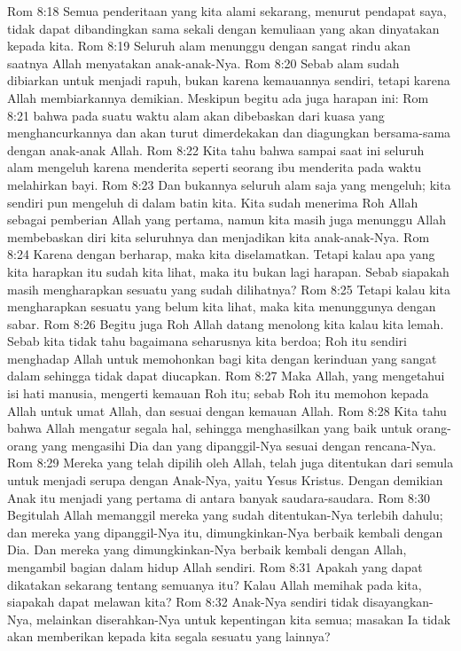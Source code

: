 Rom 8:18  Semua penderitaan yang kita alami sekarang, menurut pendapat saya, tidak dapat dibandingkan sama sekali dengan kemuliaan yang akan dinyatakan kepada kita.
Rom 8:19  Seluruh alam menunggu dengan sangat rindu akan saatnya Allah menyatakan anak-anak-Nya.
Rom 8:20  Sebab alam sudah dibiarkan untuk menjadi rapuh, bukan karena kemauannya sendiri, tetapi karena Allah membiarkannya demikian. Meskipun begitu ada juga harapan ini:
Rom 8:21  bahwa pada suatu waktu alam akan dibebaskan dari kuasa yang menghancurkannya dan akan turut dimerdekakan dan diagungkan bersama-sama dengan anak-anak Allah.
Rom 8:22  Kita tahu bahwa sampai saat ini seluruh alam mengeluh karena menderita seperti seorang ibu menderita pada waktu melahirkan bayi.
Rom 8:23  Dan bukannya seluruh alam saja yang mengeluh; kita sendiri pun mengeluh di dalam batin kita. Kita sudah menerima Roh Allah sebagai pemberian Allah yang pertama, namun kita masih juga menunggu Allah membebaskan diri kita seluruhnya dan menjadikan kita anak-anak-Nya.
Rom 8:24  Karena dengan berharap, maka kita diselamatkan. Tetapi kalau apa yang kita harapkan itu sudah kita lihat, maka itu bukan lagi harapan. Sebab siapakah masih mengharapkan sesuatu yang sudah dilihatnya?
Rom 8:25  Tetapi kalau kita mengharapkan sesuatu yang belum kita lihat, maka kita menunggunya dengan sabar.
Rom 8:26  Begitu juga Roh Allah datang menolong kita kalau kita lemah. Sebab kita tidak tahu bagaimana seharusnya kita berdoa; Roh itu sendiri menghadap Allah untuk memohonkan bagi kita dengan kerinduan yang sangat dalam sehingga tidak dapat diucapkan.
Rom 8:27  Maka Allah, yang mengetahui isi hati manusia, mengerti kemauan Roh itu; sebab Roh itu memohon kepada Allah untuk umat Allah, dan sesuai dengan kemauan Allah.
Rom 8:28  Kita tahu bahwa Allah mengatur segala hal, sehingga menghasilkan yang baik untuk orang-orang yang mengasihi Dia dan yang dipanggil-Nya sesuai dengan rencana-Nya.
Rom 8:29  Mereka yang telah dipilih oleh Allah, telah juga ditentukan dari semula untuk menjadi serupa dengan Anak-Nya, yaitu Yesus Kristus. Dengan demikian Anak itu menjadi yang pertama di antara banyak saudara-saudara.
Rom 8:30  Begitulah Allah memanggil mereka yang sudah ditentukan-Nya terlebih dahulu; dan mereka yang dipanggil-Nya itu, dimungkinkan-Nya berbaik kembali dengan Dia. Dan mereka yang dimungkinkan-Nya berbaik kembali dengan Allah, mengambil bagian dalam hidup Allah sendiri.
Rom 8:31  Apakah yang dapat dikatakan sekarang tentang semuanya itu? Kalau Allah memihak pada kita, siapakah dapat melawan kita?
Rom 8:32  Anak-Nya sendiri tidak disayangkan-Nya, melainkan diserahkan-Nya untuk kepentingan kita semua; masakan Ia tidak akan memberikan kepada kita segala sesuatu yang lainnya?
